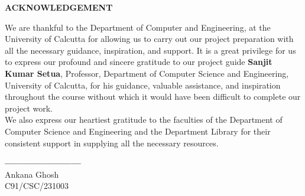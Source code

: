 \begin{center}
    {\large {\bf ACKNOWLEDGEMENT}}
\end{center}

We are thankful to the Department of Computer and Engineering, at the University of Calcutta for allowing us to carry out our project preparation with all the necessary guidance, inspiration, and support. It is a great privilege for us to express our profound and sincere gratitude to our project guide  \textbf{Sanjit Kumar Setua}, Professor, Department of Computer Science and Engineering, University of Calcutta, for his guidance, valuable assistance, and inspiration throughout the course without which it would have been difficult to complete our project work. \\
We also express our heartiest gratitude to the faculties of the Department of Computer Science and Engineering and the Department Library for their consistent support in supplying all the necessary resources. \\

\vspace{10em}

\textbf{------------------------}\\
\hspace*{.4in} Ankana Ghosh \\
\hspace*{.3in}C91/CSC/231003